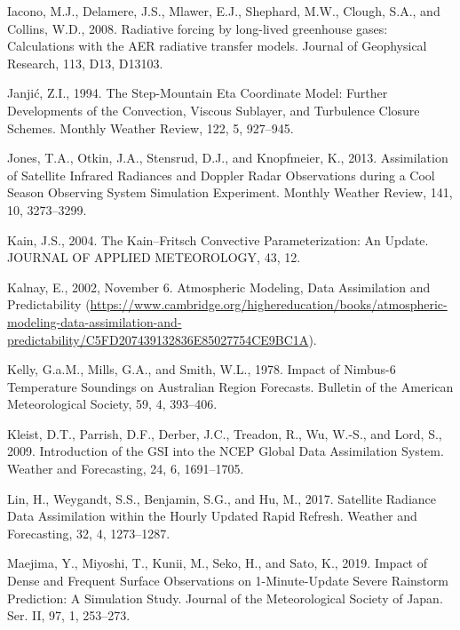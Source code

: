 \documentclass[12pt,twoside]{reedthesis}
\begin{document}
\leavevmode\hypertarget{ref-iacono2008}{}%
Iacono, M.J., Delamere, J.S., Mlawer, E.J., Shephard, M.W., Clough, S.A., and Collins, W.D., 2008. Radiative forcing by long-lived greenhouse gases: Calculations with the AER radiative transfer models. Journal of Geophysical Research, 113, D13, D13103.

\leavevmode\hypertarget{ref-janjic1994}{}%
Janjić, Z.I., 1994. The Step-Mountain Eta Coordinate Model: Further Developments of the Convection, Viscous Sublayer, and Turbulence Closure Schemes. Monthly Weather Review, 122, 5, 927--945.

\leavevmode\hypertarget{ref-jones2013}{}%
Jones, T.A., Otkin, J.A., Stensrud, D.J., and Knopfmeier, K., 2013. Assimilation of Satellite Infrared Radiances and Doppler Radar Observations during a Cool Season Observing System Simulation Experiment. Monthly Weather Review, 141, 10, 3273--3299.

\leavevmode\hypertarget{ref-kain2004}{}%
Kain, J.S., 2004. The Kain--Fritsch Convective Parameterization: An Update. JOURNAL OF APPLIED METEOROLOGY, 43, 12.

\leavevmode\hypertarget{ref-kalnay2002}{}%
Kalnay, E., 2002, November 6. Atmospheric Modeling, Data Assimilation and Predictability (\url{https://www.cambridge.org/highereducation/books/atmospheric-modeling-data-assimilation-and-predictability/C5FD207439132836E85027754CE9BC1A}).

\leavevmode\hypertarget{ref-kelly1978}{}%
Kelly, G.a.M., Mills, G.A., and Smith, W.L., 1978. Impact of Nimbus-6 Temperature Soundings on Australian Region Forecasts. Bulletin of the American Meteorological Society, 59, 4, 393--406.

\leavevmode\hypertarget{ref-kleist2009}{}%
Kleist, D.T., Parrish, D.F., Derber, J.C., Treadon, R., Wu, W.-S., and Lord, S., 2009. Introduction of the GSI into the NCEP Global Data Assimilation System. Weather and Forecasting, 24, 6, 1691--1705.

\leavevmode\hypertarget{ref-lin2017a}{}%
Lin, H., Weygandt, S.S., Benjamin, S.G., and Hu, M., 2017. Satellite Radiance Data Assimilation within the Hourly Updated Rapid Refresh. Weather and Forecasting, 32, 4, 1273--1287.

\leavevmode\hypertarget{ref-maejima2019}{}%
Maejima, Y., Miyoshi, T., Kunii, M., Seko, H., and Sato, K., 2019. Impact of Dense and Frequent Surface Observations on 1-Minute-Update Severe Rainstorm Prediction: A Simulation Study. Journal of the Meteorological Society of Japan. Ser. II, 97, 1, 253--273.
\end{document}
